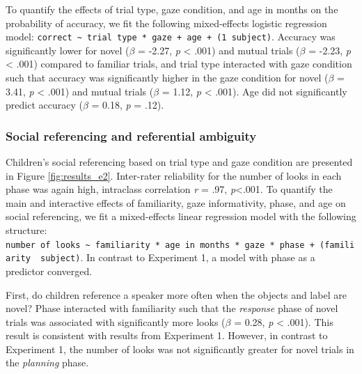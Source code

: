 \documentclass[a4paper,man,apacite,floatsintext]{apa6}
\begin{document}
To quantify the effects of trial type, gaze condition, and age in months
on the probability of accuracy, we fit the following mixed-effects
logistic regression model:
\texttt{correct\ \textasciitilde{}\ trial\ type\ *\ gaze\ +\ age\ +\ (1\textbar{}\ subject)}.
Accuracy was significantly lower for novel (\(\beta\) = -2.27, \emph{p}
\textless{} .001) and mutual trials (\(\beta\) = -2.23, \emph{p}
\textless{} .001) compared to familiar trials, and trial type interacted
with gaze condition such that accuracy was significantly higher in the
gaze condition for novel (\(\beta\) = 3.41, \emph{p} \textless{} .001)
and mutual trials (\(\beta\) = 1.12, \emph{p} \textless{} .001). Age did
not significantly predict accuracy (\(\beta\) = 0.18, \emph{p} = .12).

\subsubsection{Social referencing and referential
ambiguity}\label{social-referencing-and-referential-ambiguity}

Children's social referencing based on trial type and gaze condition are
presented in Figure \ref{fig:results_e2}. Inter-rater reliability for
the number of looks in each phase was again high, intraclass correlation
\emph{r} = .97, \emph{p}\textless{}.001. To quantify the main and
interactive effects of familiarity, gaze informativity, phase, and age
on social referencing, we fit a mixed-effects linear regression model
with the following structure:
\texttt{number\ of\ looks\ \textasciitilde{}\ familiarity\ *\ age\ in\ months\ *\ gaze\ *\ phase\ +\ (familiarity\ \textbar{}\ subject)}.
In contrast to Experiment 1, a model with phase as a predictor
converged.

First, do children reference a speaker more often when the objects and
label are novel? Phase interacted with familiarity such that the
\emph{response} phase of novel trials was associated with significantly
more looks (\(\beta\) = 0.28, \emph{p} \textless{} .001). This result is
consistent with results from Experiment 1. However, in contrast to
Experiment 1, the number of looks was not significantly greater for
novel trials in the \emph{planning} phase.
\end{document}
